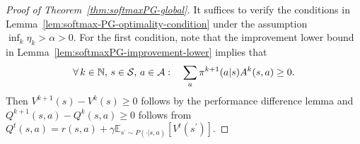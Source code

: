 

\begin{proof}[Proof of Theorem~\ref{thm:softmaxPG-global}]
    It suffices to verify the conditions in Lemma~\ref{lem:softmax-PG-optimality-condition} under the assumption $\inf_k \eta_k > \alpha>0$. For the first condition, note that the improvement lower bound in Lemma~\ref{lem:softmaxPG-improvement-lower} implies that
    \begin{align*}
        \forall\, k\in\mathbb{N}, \,s\in{\cal S}, \, a\in{\cal A}: \quad \sum_{a} \pi^{k+1}(a|s) A^k(s,a) \geq 0.
    \end{align*}
    Then $V^{k+1}(s) - V^k(s) \geq 0$ follows  by the performance difference lemma and $Q^{k+1}(s,a) - Q^k(s,a)\geq 0$ follows from $Q^t(s,a) = r(s,a) + \gamma \mathbb{E}_{s^\prime \sim P(\cdot|s,a)} \left[ V^t(s^\prime) \right]$.
    

\end{proof}
